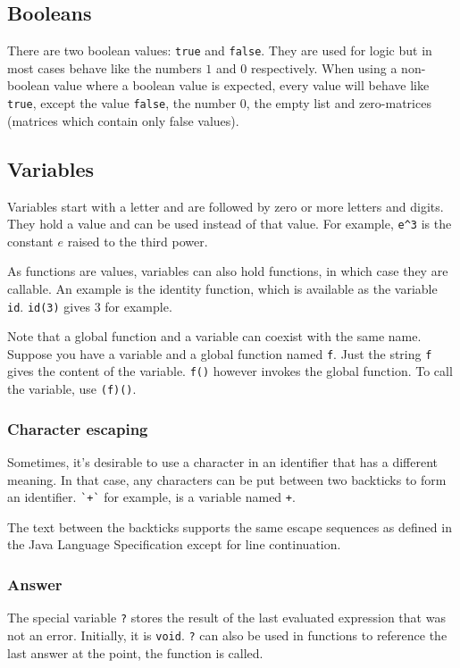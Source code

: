 \documentclass[10pt]{article}
\begin{document}
    \subsection{Booleans}\label{subsec:booleans}
    There are two boolean values: \verb|true| and \verb|false|.
    They are used for logic but in most cases behave like the numbers $ 1 $ and $ 0 $ respectively.
    When using a non-boolean value where a boolean value is expected, every value will behave like \verb|true|, except the value \verb|false|, the number $ 0 $, the empty list and zero-matrices (matrices  which contain only false values).
    
    \subsection{Variables}\label{subsec:variables}
    Variables start with a letter and are followed by zero or more letters and digits.
    They hold a value and can be used instead of that value.
    For example, \verb|e^3| is the constant $ e $ raised to the third power.
    
    As functions are values, variables can also hold functions, in which case they are callable.
    An example is the identity function, which is available as the variable \verb|id|.
    \verb|id(3)| gives $ 3 $ for example.
    
    Note that a global function and a variable can coexist with the same name.
    Suppose you have a variable and a global function named \verb|f|.
    Just the string \verb|f| gives the content of the variable.
    \verb|f()| however invokes the global function.
    To call the variable, use \verb|(f)()|.
    
    \subsubsection{Character escaping}
    Sometimes, it's desirable to use a character in an identifier that has a different meaning.
    In that case, any characters can be put between two backticks to form an identifier.
    \verb|`+`| for example, is a variable named \verb|+|.

    The text between the backticks supports the same escape sequences as defined in the Java Language Specification except for line continuation.
    
    \subsubsection{Answer}
    The special variable \verb|?| stores the result of the last evaluated expression that was not an error.
    Initially, it is \verb|void|.
    \verb|?| can also be used in functions to reference the last answer at the point, the function is called.
    
\end{document}
